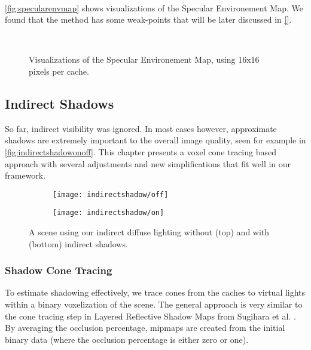 \documentclass[thesis.tex]{subfiles}
\begin{document}
\\
\autoref{fig:specularenvmap} shows visualizations of the Specular Environement Map.
We found that the method has some weak-points that will be later discussed in \autoref{}. 
\begin{figure}[h!]
\centering
{}
\\
\caption{Visualizations of the Specular Environement Map, using 16x16 pixels per cache.}
\label{fig:specularenvmap}
\end{figure}

\subsection{Indirect Shadows} \label{sec:main:shadowing}
So far, indirect visibility was ignored.
In most cases however, approximate shadows are extremely important to the overall image quality, seen for example in \autoref{fig:indirectshadowonoff}.
This chapter presents a voxel cone tracing based approach with several adjustments and new simplifications that fit well in our framework.
\begin{figure}[h!]
\centering
\begin{subfigure}[b]{\textwidth}
	\texttt{[image: indirectshadow/off]}
\end{subfigure}

\vspace{8pt}
\begin{subfigure}[b]{\textwidth}
	\texttt{[image: indirectshadow/on]}
\end{subfigure}
\caption{A scene using our indirect diffuse lighting without (top) and with (bottom) indirect shadows.}
\label{fig:indirectshadowonoff}
\end{figure}

\subsubsection{Shadow Cone Tracing}\label{sec:impl:voxelization}
To estimate shadowing effectively, we trace cones from the caches to virtual lights within a binary voxelization of the scene.
The general approach is very similar to the cone tracing step in Layered Reflective Shadow Maps from Sugihara et al. \cite{bib:layeredrsm}. %
By averaging the occlusion percentage, mipmaps are created from the initial binary data (where the occlusion percentage is either zero or one).
\end{document}
